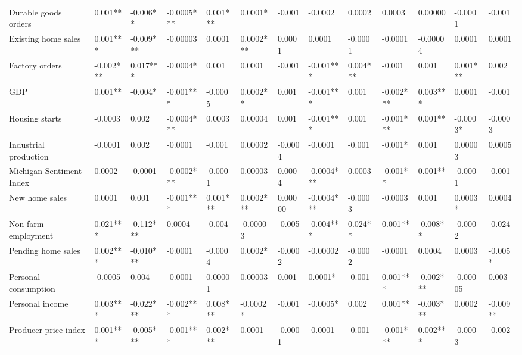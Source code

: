 \begin{landscape}
\begin{table}[]
{\begin{tabular}{lllllllllllll}
Durable goods orders     & 0.001**   & -0.006**  & -0.0005*** & 0.001*** & 0.0001*   & -0.001    & -0.0002    & 0.0002   & 0.0003    & 0.00000   & -0.0001   & -0.001   \\
Existing home sales      & 0.001***  & -0.009*** & -0.00003   & 0.0001   & 0.0002*** & 0.0001    & 0.0001     & -0.0001  & -0.0001   & -0.00004  & 0.0001    & 0.0001   \\
Factory orders           & -0.002*** & 0.017***  & -0.0004*   & 0.001    & 0.0001    & -0.001    & -0.001***  & 0.004*** & -0.001    & 0.001     & 0.001***  & 0.002    \\
GDP                      & 0.001**   & -0.004*   & -0.001***  & -0.0005  & 0.0002**  & 0.001     & -0.001***  & 0.001    & -0.002*** & 0.003***  & 0.0001    & -0.001   \\
Housing starts           & -0.0003   & 0.002     & -0.0004*** & 0.0003   & 0.00004   & 0.001     & -0.001***  & 0.001    & -0.001*** & 0.001**   & -0.0003*  & -0.0003  \\
Industrial production    & -0.0001   & 0.002     & -0.0001    & -0.001   & 0.00002   & -0.0004   & -0.0001    & -0.001   & -0.001*   & 0.001     & 0.00003   & 0.0005   \\
Michigan Sentiment Index & 0.0002    & -0.0001   & -0.0002*** & -0.0001  & 0.00003   & 0.0004    & -0.0004*** & 0.0003   & -0.001**  & 0.001**   & -0.0001   & -0.001   \\
New home sales           & 0.0001    & 0.001     & -0.001***  & 0.001*** & 0.0002*** & 0.00000   & -0.0004*** & -0.0003  & -0.0003   & 0.001     & 0.0003*   & 0.0004   \\
Non-farm employment      & 0.021***  & -0.112*** & 0.0004     & -0.004   & -0.00003  & -0.005    & -0.004***  & 0.024**  & 0.001**   & -0.008**  & -0.0002   & -0.024   \\
Pending home sales       & 0.002***  & -0.010*** & -0.0001    & -0.0004  & 0.0002*   & -0.0002   & -0.00002   & -0.0002  & -0.0001   & 0.0004    & 0.0003    & -0.005*  \\
Personal consumption     & -0.0005   & 0.004     & -0.0001    & 0.00001  & 0.00003   & 0.001     & 0.0001*    & -0.001   & 0.001***  & -0.002*** & -0.00005  & 0.003    \\
Personal income          & 0.003***  & -0.022*** & -0.002***  & 0.008*** & -0.0002*  & -0.001    & -0.0005*   & 0.002    & 0.001**   & -0.003*** & 0.0002    & -0.009** \\
Producer price index     & 0.001***  & -0.005*** & -0.001***  & 0.002*** & 0.0001    & -0.0001   & -0.0001    & -0.001   & -0.001*** & 0.002***  & -0.0003   & -0.002   \\

\end{tabular}}
\end{table}
\end{landscape}
